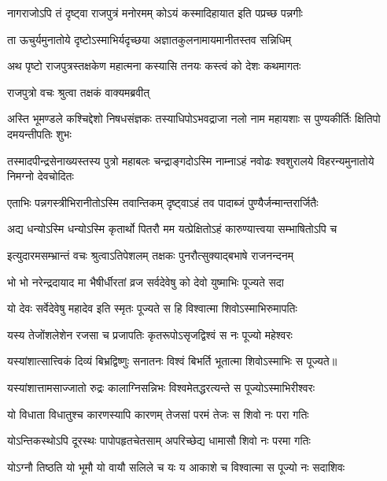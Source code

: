 \twolineshloka
{नागराजोऽपि तं दृष्ट्वा राजपुत्रं मनोरमम्}
{कोऽयं कस्मादिहायात इति पप्रच्छ पन्नगीः} %

\twolineshloka
{ता ऊचुर्यमुनातोये दृष्टोऽस्माभिर्यदृच्छया}
{अज्ञातकुलनामायमानीतस्तव सन्निधिम्} %

\twolineshloka
{अथ पृष्टो राजपुत्रस्तक्षकेण महात्मना}
{कस्यासि तनयः कस्त्वं को देशः कथमागतः} %

\onelineshloka
{राजपुत्रो वचः श्रुत्वा तक्षकं वाक्यमब्रवीत्} %

\threelineshloka
{अस्ति भूमण्डले कश्चिद्देशो निषधसंज्ञकः}
{तस्याधिपोऽभवद्राजा नलो नाम महायशाः}
{स पुण्यकीर्तिः क्षितिपो दमयन्तीपतिः शुभः} %

\threelineshloka
{तस्मादपीन्द्रसेनाख्यस्तस्य पुत्रो महाबलः}
{चन्द्राङ्गदोऽस्मि नाम्नाऽहं नवोढः श्वशुरालये}
{विहरन्यमुनातोये निमग्नो देवचोदितः} %

\twolineshloka
{एताभिः पन्नगस्त्रीभिरानीतोऽस्मि तवान्तिकम्}
{दृष्ट्वाऽहं तव पादाब्जं पुण्यैर्जन्मान्तरार्जितैः} %

\twolineshloka
{अद्य धन्योऽस्मि धन्योऽस्मि कृतार्थो पितरौ मम}
{यत्प्रेक्षितोऽहं कारुण्यात्त्वया सम्भाषितोऽपि च} %

\twolineshloka
{इत्युदारमसम्भ्रान्तं वचः श्रुत्वाऽतिपेशलम्}
{तक्षकः पुनरौत्सुक्याद्बभाषे राजनन्दनम्} %

\twolineshloka
{भो भो नरेन्द्रदायाद मा भैषीर्धीरतां व्रज}
{सर्वदेवेषु को देवो युष्माभिः पूज्यते सदा} %

\twolineshloka
{यो देवः सर्वेदेवेषु महादेव इति स्मृतः}
{पूज्यते स हि विश्वात्मा शिवोऽस्माभिरुमापतिः} %

\twolineshloka
{यस्य तेजोंशलेशेन रजसा च प्रजापतिः}
{कृतरूपोऽसृजद्विश्वं स नः पूज्यो महेश्वरः} %

\twolineshloka
{यस्यांशात्सात्त्विकं दिव्यं बिभ्रद्विष्णुः सनातनः}
{विश्वं बिभर्ति भूतात्मा शिवोऽस्माभिः स पूज्यते॥} %

\twolineshloka
{यस्यांशात्तामसाज्जातो रुद्रः कालाग्निसन्निभः}
{विश्वमेतद्धरत्यन्ते स पूज्योऽस्माभिरीश्वरः} %

\twolineshloka
{यो विधाता विधातुश्च कारणस्यापि कारणम्}
{तेजसां परमं तेजः स शिवो नः परा गतिः} %

\twolineshloka
{योऽन्तिकस्थोऽपि दूरस्थः पापोपहृतचेतसाम्}
{अपरिच्छेद्य धामासौ शिवो नः परमा गतिः} %

\twolineshloka
{योऽग्नौ तिष्ठति यो भूमौ यो वायौ सलिले च यः}
{य आकाशे च विश्वात्मा स पूज्यो नः सदाशिवः} %

